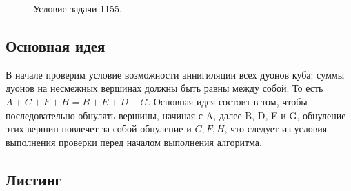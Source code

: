 \documentclass[a5paper, 10pt]{article}
\theoremstyle{definition}
\theoremstyle{plain}
\theoremstyle{remark}
\begin{document}
\begin{figure}[h]
\caption{Условие задачи 1155.}
\end{figure}

\subsection{Основная идея}
В начале проверим условие возможности аннигиляции всех дуонов куба: суммы дуонов на несмежных вершинах должны быть равны между собой. То есть $A + C + F + H = B + E + D + G$. Основная идея состоит в том, чтобы последовательно обнулять вершины, начиная с A, далее B,  D, E и G, обнуление этих вершин повлечет за собой обнуление и $C, F, H$, что следует из условия выполнения проверки перед началом выполнения алгоритма.

\subsection{Листинг}
\end{document}
